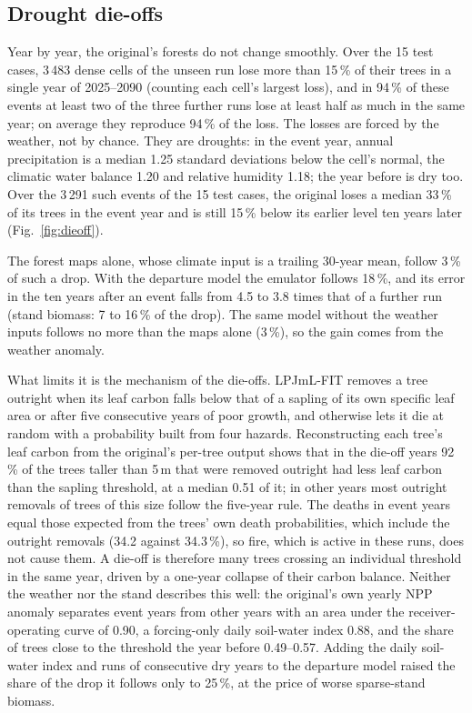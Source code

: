 \documentclass[11pt,a4paper]{article}
\begin{document}
\subsection{Drought die-offs}\label{sec:dieoff}

Year by year, the original's forests do not change smoothly. Over the 15 test cases, 3\,483 dense cells of the
unseen run lose more than 15\,\% of their trees in a single year of 2025--2090 (counting each cell's largest loss), and
in 94\,\% of these events at least two of the three further runs lose at least half as much in the same year; on
average they reproduce 94\,\% of the loss. The losses are forced by the weather, not by chance. They are droughts: in the event year, annual precipitation is a median 1.25 standard deviations below the
cell's normal, the climatic water balance 1.20 and relative humidity 1.18; the year before is dry too. Over the 3\,291
such events of the 15 test cases, the original loses a median 33\,\% of its trees in the event year and is still
15\,\% below its earlier level ten years later (Fig.~\ref{fig:dieoff}).

The forest maps alone, whose climate input is a trailing 30-year mean, follow 3\,\% of such a drop. With the
departure model the emulator follows 18\,\%, and its error in the ten years after an event falls from 4.5 to 3.8 times
that of a further run (stand biomass: 7 to 16\,\% of the drop). The same model without the weather inputs follows no more than the maps alone (3\,\%), so the gain comes from
the weather anomaly.

What limits it is the mechanism of the die-offs. LPJmL-FIT removes a tree outright when its leaf carbon falls below
that of a sapling of its own specific leaf area or after five consecutive years of poor growth, and otherwise lets it
die at random with a probability built from four hazards. Reconstructing each tree's leaf carbon from the original's
per-tree output shows that in the die-off years 92\,\% of the trees taller than 5\,m that were removed outright had
less leaf carbon than the sapling threshold, at a median 0.51 of it; in other years most outright removals of trees
of this size follow the five-year rule. The deaths in event years equal those expected from the trees' own death
probabilities, which include the outright removals (34.2 against 34.3\,\%), so fire, which is active in these runs,
does not cause them. A die-off is therefore many trees crossing an individual threshold in the same year, driven by a
one-year collapse of their carbon balance. Neither the weather nor the stand describes this well: the original's own yearly NPP anomaly
separates event years from other years with an area under the receiver-operating curve of 0.90, a forcing-only daily
soil-water index 0.88, and the share of trees close to the threshold the year before 0.49--0.57. Adding the daily
soil-water index and runs of consecutive dry years to the departure model raised the share of the drop it follows only
to 25\,\%, at the price of worse sparse-stand biomass.
\end{document}
